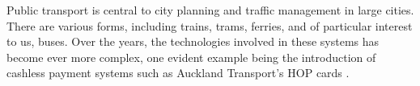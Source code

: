 \documentclass[12pt,a4paper]{article}
\begin{document}














Public transport is central to city planning and traffic management in large cities.
There are various forms, including trains, trams, ferries, and of particular interest to us, buses.
Over the years, the technologies involved in these systems has become ever more complex,
one evident example being the introduction of cashless payment systems such as Auckland Transport's HOP cards \citep{cn}.
\end{document}
